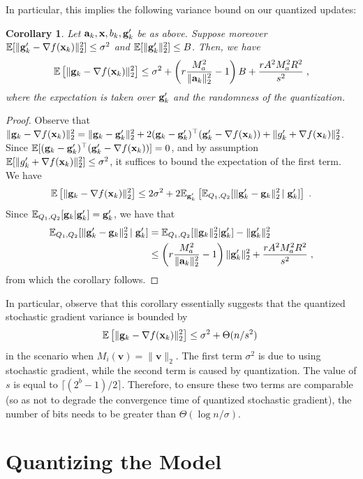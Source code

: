 \documentclass{article}
\renewcommand{\vec}[1]{\mathbf{#1}}
\def\a{{\bf a}}
\def\g{{\bf g}}
\def\x{{\bf x}}
\def\E{\mathbb{E}}
\newtheorem{corollary}{Corollary}
\begin{document}
In particular, this implies the following variance bound on our quantized updates:
\begin{corollary}
\label{cor:var-bound}
    Let $\a_k, \x, b_k, \g'_k$ be as above.
    Suppose moreover $\E [\| \g'_k - \nabla f(\x_k) \|_2^2 ] \leq \sigma^2$ and $\E [\| \g'_k \|_2^2] \leq B$.
    Then, we have
    \[
    \E \left[ \| \g_k - \nabla f(\x_k) \|_2^2 \right] \leq  \sigma^2 + \left(r \frac{M_a^2}{\| \a_k \|_2^2} - 1\right) B + \frac{r A^2 M_a^2 R^2}{s^2} \; ,
    \]
    where the expectation is taken over $\g'_k$ and the randomness of the quantization.
\end{corollary}
\begin{proof}
    Observe that $\| \g_k - \nabla f(\x_k) \|_2^2 = \| \g_k - \g'_k \|_2^2 + 2 (\g_k - \g'_k)^\top (\g'_k - \nabla f(\x_k)) + \| g'_k + \nabla f(\x_k) \|_2^2$.
    Since $\E [(\g_k - \g'_k)^\top (\g'_k - \nabla f(\x_k))] = 0$, and by assumption $\E [ \| g'_k + \nabla f(\x_k) \|_2^2] \leq \sigma^2$, it suffices to bound the expectation of the first term.
    We have
    \[
     \E \left[ \| \g_k - \nabla f(\x_k) \|_2^2 \right] \leq 2 \sigma^2 + 2\E_{\g'_k} \left[ \E_{Q_1, Q_2} [ \| \g'_k - \g_k \|_2^2 \left| \right. \g'_k ] \right] \; .
    \]
    Since $\E_{Q_1, Q_2} [\g_k | \g'_k] = \g'_k $, we have that 
    \begin{align*}
    \E_{Q_1, Q_2} [ \| \g'_k - \g_k \|_2^2 \left| \right. \g'_k ] &= \E_{Q_1, Q_2} [\| \g_k \|_2^2 | \g'_k] - \| \g'_k \|_2^2 \\
    &\leq \left(r \frac{M_a^2}{\| \a_k \|_2^2} - 1\right) \| \g'_k \|_2^2 + \frac{r A^2 M_a^2 R^2}{s^2} \; ,
    \end{align*}
    from which the corollary follows.
\end{proof}

In particular, observe that this corollary essentially suggests that the quantized stochastic gradient variance is bounded by
\[
\E \left[ \| \g_k - \nabla f(\x_k) \|_2^2 \right] \leq \sigma^2 + \Theta(n/s^2) \;
\]
in the scenario when $M_i (\vec{v}) = \| \vec{v} \|_2 $.
The first term $\sigma^2$ is due to using stochastic gradient, while the second term is caused by quantization. The value of $s$ is equal to  $\lceil(2^b - 1) / 2\rceil$. Therefore, to ensure these two terms are comparable (so as not to degrade the convergence time of quantized stochastic gradient), the number of bits needs to be greater than $\Theta(\log n / \sigma)$.   

\section{Quantizing the Model}
\end{document}
